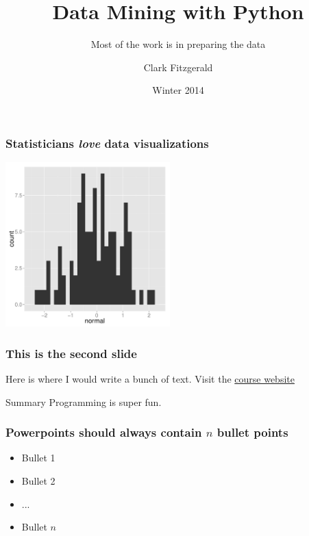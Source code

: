 \documentclass{beamer}
\begin{document}
\title[Python] %
{Data Mining with Python}
\subtitle{Most of the work is in preparing the data}
\author{Clark Fitzgerald}
\date{Winter 2014} %
\subject{Statistics}


\frame{\titlepage}


\begin{frame}
\frametitle{Statisticians \emph{love} data visualizations}
\centerline{\includegraphics[height=2.5in]{figs/normal.pdf}}
\end{frame}


\begin{frame}
\frametitle{This is the second slide}
Here is where I would write a bunch of text. Visit the \href{https://github.com/nick-ulle/2015-python-course}{course website}
    \begin{block}{Summary}
    Programming is super fun.
    \end{block}
\end{frame}


\begin{frame}
\frametitle{Powerpoints should always contain $n$ bullet points}

\begin{itemize}
\item Bullet 1
\item Bullet 2
\item ...
\item Bullet $n$
\end{itemize}

\end{frame}
\end{document}
